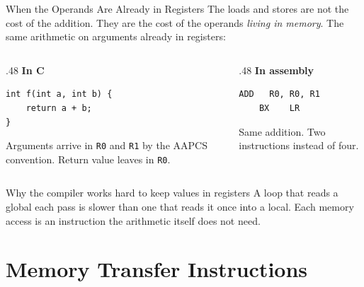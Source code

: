 \documentclass[9pt,aspectratio=169,xcolor=table]{beamer}
\begin{document}
\begin{frame}[fragile]{When the Operands Are Already in Registers}
    \leavevmode
    {\small The loads and stores are not the cost of the addition. They are
    the cost of the operands \emph{living in memory}. The same arithmetic
    on arguments already in registers:}

    \vspace{2mm}
    \begin{columns}[T]
    \begin{column}{.48\textwidth}
        \textbf{In C}

        \vspace{1mm}
        \begin{lstlisting}[style=myc]
int f(int a, int b) {
    return a + b;
}
        \end{lstlisting}

        \vspace{2mm}
        {\footnotesize Arguments arrive in \texttt{R0} and \texttt{R1} by
        the AAPCS convention. Return value leaves in \texttt{R0}.}
    \end{column}
    \begin{column}{.48\textwidth}
        \textbf{In assembly}

        \vspace{1mm}
        \begin{lstlisting}[style=armasm, language=ARM, basicstyle=\normalsize\ttfamily]
	ADD   R0, R0, R1
	BX    LR
        \end{lstlisting}

        \vspace{3mm}
        {\small Same addition. \alert{Two instructions} instead of four.}
    \end{column}
    \end{columns}

    \vspace{3mm}
    \begin{block}{Why the compiler works hard to keep values in registers}
        A loop that reads a global each pass is slower than one that reads
        it once into a local. Each memory access is an instruction the
        arithmetic itself does not need.
    \end{block}
\end{frame}

\section{Memory Transfer Instructions}
\end{document}
